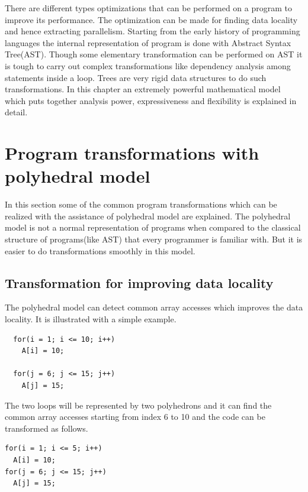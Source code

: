 \label{chap:background}

There are different types optimizations that can be performed on a program to improve its
performance. The optimization can be made for finding data locality and hence extracting
parallelism. Starting from the early history of programming languages the internal representation
of program is done with Abstract Syntax Tree(AST). Though some elementary transformation can
be performed on AST it is tough to carry out complex transformations like dependency analysis among
statements inside a loop. Trees are very rigid data structures to do such transformations.
In this chapter an extremely powerful mathematical model which puts together analysis power,
expressiveness and flexibility is explained in detail.

\section{Program transformations with polyhedral model}

In this section some of the common program transformations which can be realized with the
assistance of polyhedral model are explained. The polyhedral model is not a normal
representation of programs when compared to the
classical structure of programs(like AST) that every programmer is familiar with. But
it is easier to do transformations smoothly in this model.

\subsection{Transformation for improving data locality}

The polyhedral model can detect common array accesses which improves the data locality. It is
illustrated with a simple example.
{\footnotesize
\begin{lstlisting}
  for(i = 1; i <= 10; i++)
    A[i] = 10;

  for(j = 6; j <= 15; j++)
    A[j] = 15;
\end{lstlisting}
}

The two loops will be represented by two polyhedrons and it can find the common 
array accesses starting from index 6 to 10 and the code can be transformed as follows.

{\footnotesize
\begin{lstlisting}
for(i = 1; i <= 5; i++)
  A[i] = 10;
for(j = 6; j <= 15; j++)
  A[j] = 15;
\end{lstlisting}
}

